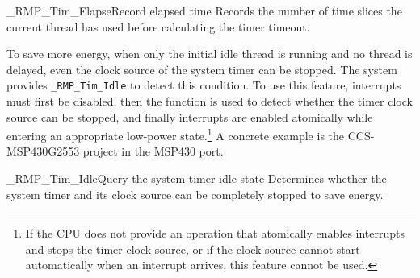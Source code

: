 \begin{apidesc}{\_RMP\_Tim\_Elapse}{Record elapsed time}\label{port:Tim_Elapse}
    Records the number of time slices the current thread has used before calculating the timer timeout.
    \begin{apiparams}
    \end{apiparams}
    \begin{apiret}
    \end{apiret}
\end{apidesc}

To save more energy, when only the initial idle thread is running and no thread is delayed, even the clock source of the system timer can be stopped.
The system provides \texttt{\_RMP\_Tim\_Idle} to detect this condition.
To use this feature, interrupts must first be disabled, then the function is used to detect whether the timer clock source can be stopped, and finally interrupts are enabled atomically while entering an appropriate low-power state.\footnote{If the CPU does not provide an operation that atomically enables interrupts and stops the timer clock source, or if the clock source cannot start automatically when an interrupt arrives, this feature cannot be used.}
A concrete example is the CCS-MSP430G2553 project in the MSP430 port.

\begin{apidesc}{\_RMP\_Tim\_Idle}{Query the system timer idle state}\label{port:Tim_Idle}
    Determines whether the system timer and its clock source can be completely stopped to save energy.
    \begin{apiparams}
    \end{apiparams}
    \begin{apiret}
    \end{apiret}
\end{apidesc}

